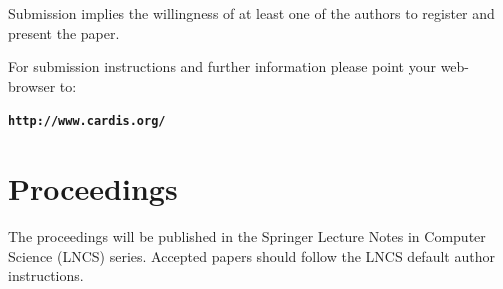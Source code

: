 \documentclass[letter]{article}
\begin{document}
\begin{tabularx}{\linewidth}
  Submission implies the willingness of at least one of the authors to
  register and present the paper.\par\bigskip

  For submission instructions and further
  information please point your web-browser to:
  \begin{center}
    \texttt{\bfseries http://www.cardis.org/}
  \end{center}
  
  \section*{Proceedings}
  The proceedings will be published in the Springer Lecture Notes in
  Computer Science (LNCS) series. Accepted papers should follow the
  LNCS default author instructions.
\end{tabularx}
\end{document}
